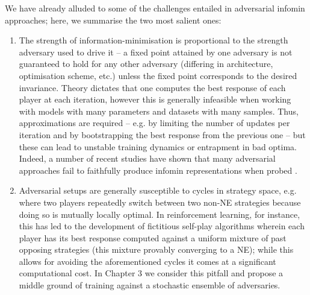 We have already alluded to some of the challenges entailed in adversarial infomin
approaches; here, we summarise the two most salient ones:
%
\begin{enumerate}
        \item The strength of information-minimisation is proportional to the strength adversary
          used to drive it -- a fixed point attained by one adversary  is not guaranteed to hold
          for any other adversary (differing in architecture, optimisation scheme, etc.) unless the
          fixed point corresponds to the desired invariance. 
          Theory dictates that one computes the best response of each player at each iteration,
          however this is generally infeasible when working with models with many parameters and
          datasets with many samples. 
          Thus, approximations are required -- e.g. by limiting the number of updates per iteration
          and by bootstrapping the best response from the previous one -- but these can lead to
          unstable training dynamics or entrapment in bad optima. 
          Indeed, a number of recent studies have shown that many adversarial approaches fail to
          faithfully produce infomin representations when probed \citep{moyer2018invariant,
          feng2019learning, balunovic2021fair}.
        \item Adversarial setups are generally susceptible to cycles in strategy space, e.g. where
          two players repeatedly switch between two non-NE strategies because doing so is mutually
          locally optimal. 
          In reinforcement learning, for instance, this has led to the development of fictitious
          self-play algorithms \citep{brown1951iterative, heinrich2015fictitious,
          vinyals2019grandmaster} wherein each player has its best response computed against a
          uniform mixture of past opposing strategies (this mixture provably converging to a NE);
          while this allows for avoiding the aforementioned cycles it comes at a significant
          computational cost.
          In Chapter 3 we consider this pitfall and propose a middle ground of training against a
          stochastic ensemble of adversaries.
\end{enumerate}



